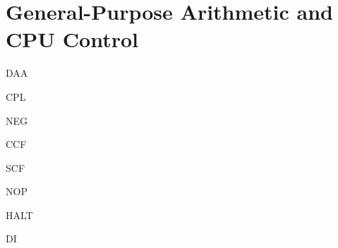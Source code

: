 \section{General-Purpose Arithmetic and CPU Control}

\begin{minipage}{\textwidth}

\begin{instrtable}

	\begin{instruction}{DAA}
		\Symbol{}
			\FlagsDAA
	\end{instruction}

	\begin{instruction}{CPL} 
		\Symbol{\SymCPL}
			\FlagsCPL
	\end{instruction}

	\begin{instruction}{NEG} 
		\Symbol{\SymNEG}
			\FlagsNEG
		\SkipToOpCode 
	\end{instruction}

	\begin{instruction}{CCF} 
		\Symbol{\SymCCF}
			\FlagsCCF
	\end{instruction}

	\begin{instruction}{SCF} 
		\Symbol{\SymSCF}
			\FlagsSCF
	\end{instruction}

	\begin{instruction}{NOP}
		\Symbol{}
			\FlagsNOP
	\end{instruction}

	\begin{instruction}{HALT}
		\Symbol{}
			\FlagsHALT
	\end{instruction}

	\begin{instruction}{DI} 
		\Symbol{\SymDI[0]}
			\FlagsDI
		\SkipToSymbol
			\Symbol{\SymDI[1]}
	\end{instruction}


\end{instrtable}
\end{minipage}

